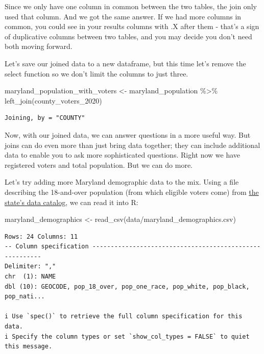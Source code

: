 \documentclass[
  letterpaper,
  DIV=11,
  numbers=noendperiod]{scrreprt}
\newenvironment{Shaded}{\begin{snugshade}}{\end{snugshade}}
\newcommand{\FunctionTok}[1]{\textcolor[rgb]{0.28,0.35,0.67}{#1}}
\newcommand{\NormalTok}[1]{\textcolor[rgb]{0.00,0.23,0.31}{#1}}
\newcommand{\OtherTok}[1]{\textcolor[rgb]{0.00,0.23,0.31}{#1}}
\newcommand{\SpecialCharTok}[1]{\textcolor[rgb]{0.37,0.37,0.37}{#1}}
\newcommand{\StringTok}[1]{\textcolor[rgb]{0.13,0.47,0.30}{#1}}
\begin{document}
Since we only have one column in common between the two tables, the join
only used that column. And we got the same answer. If we had more
columns in common, you could see in your results columns with .X after
them - that's a sign of duplicative columns between two tables, and you
may decide you don't need both moving forward.

Let's save our joined data to a new dataframe, but this time let's
remove the select function so we don't limit the columns to just three.

\begin{Shaded}
\begin{Highlighting}[]
\NormalTok{maryland\_population\_with\_voters }\OtherTok{\textless{}{-}}\NormalTok{ maryland\_population }\SpecialCharTok{\%\textgreater{}\%} \FunctionTok{left\_join}\NormalTok{(county\_voters\_2020)}
\end{Highlighting}
\end{Shaded}

\begin{verbatim}
Joining, by = "COUNTY"
\end{verbatim}

Now, with our joined data, we can answer questions in a more useful way.
But joins can do even more than just bring data together; they can
include additional data to enable you to ask more sophisticated
questions. Right now we have registered voters and total population. But
we can do more.

Let's try adding more Maryland demographic data to the mix. Using a file
describing the 18-and-over population (from which eligible voters come)
from
\href{https://planning.maryland.gov/MSDC/Pages/census/Census2020/pL_2020redistricting.aspx}{the
state's data catalog}, we can read it into R:

\begin{Shaded}
\begin{Highlighting}[]
\NormalTok{maryland\_demographics }\OtherTok{\textless{}{-}} \FunctionTok{read\_csv}\NormalTok{(}\StringTok{\textquotesingle{}data/maryland\_demographics.csv\textquotesingle{}}\NormalTok{)}
\end{Highlighting}
\end{Shaded}

\begin{verbatim}
Rows: 24 Columns: 11
-- Column specification --------------------------------------------------------
Delimiter: ","
chr  (1): NAME
dbl (10): GEOCODE, pop_18_over, pop_one_race, pop_white, pop_black, pop_nati...

i Use `spec()` to retrieve the full column specification for this data.
i Specify the column types or set `show_col_types = FALSE` to quiet this message.
\end{verbatim}
\end{document}
